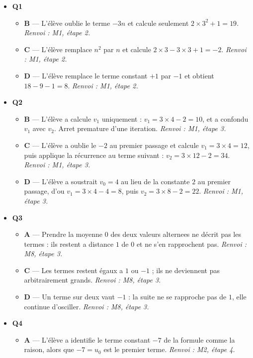 \begin{itemize}
  \item \textbf{Q1}
  \begin{itemize}
    \item \textbf{B} — L'élève oublie le terme $-3n$ et calcule seulement $2 \times 3^2+1=19$. \emph{Renvoi : M1, étape 2.}
    \item \textbf{C} — L'élève remplace $n^2$ par $n$ et calcule $2 \times 3-3 \times 3+1=-2$. \emph{Renvoi : M1, étape 2.}
    \item \textbf{D} — L'élève remplace le terme constant $+1$ par $-1$ et obtient $18-9-1=8$. \emph{Renvoi : M1, étape 2.}
  \end{itemize}
  \item \textbf{Q2}
  \begin{itemize}
    \item \textbf{B} — L'élève a calcule $v_1$ uniquement : $v_1 = 3 \times 4 - 2 = 10$, et a confondu $v_1$ avec $v_2$. Arret premature d'une iteration. \emph{Renvoi : M1, étape 3.}
    \item \textbf{C} — L'élève a oublie le $-2$ au premier passage et calcule $v_1=3\times4=12$, puis applique la récurrence au terme suivant : $v_2=3\times12-2=34$. \emph{Renvoi : M1, étape 3.}
    \item \textbf{D} — L'élève a soustrait $v_0=4$ au lieu de la constante $2$ au premier passage, d'ou $v_1=3\times4-4=8$, puis $v_2=3\times8-2=22$. \emph{Renvoi : M1, étape 3.}
  \end{itemize}
  \item \textbf{Q3}
  \begin{itemize}
    \item \textbf{A} — Prendre la moyenne $0$ des deux valeurs alternees ne décrit pas les termes : ils restent a distance $1$ de $0$ et ne s'en rapprochent pas. \emph{Renvoi : M8, étape 3.}
    \item \textbf{C} — Les termes restent égaux a $1$ ou $-1$ ; ils ne deviennent pas arbitrairement grands. \emph{Renvoi : M8, étape 3.}
    \item \textbf{D} — Un terme sur deux vaut $-1$ : la suite ne se rapproche pas de $1$, elle continue d'osciller. \emph{Renvoi : M8, étape 3.}
  \end{itemize}
  \item \textbf{Q4}
  \begin{itemize}
    \item \textbf{A} — L'élève a identifie le terme constant $-7$ de la formule comme la raison, alors que $-7 = u_0$ est le premier terme. \emph{Renvoi : M2, étape 4.}

\end{itemize}
\end{itemize}
